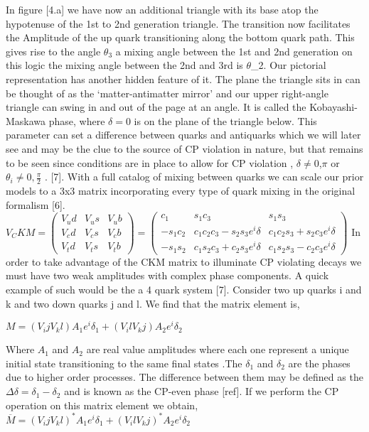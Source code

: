 In figure [4.a] we have now an additional triangle with its base atop the hypotenuse of the 1st to 2nd generation triangle. The transition now facilitates the Amplitude of the up quark transitioning along the bottom quark path. This gives rise to the angle $\theta_3$ a mixing angle between the 1st and 2nd generation on this logic the mixing angle between the 2nd and 3rd is $\theta$_2. Our pictorial representation has another hidden feature of it. The plane the triangle sits in can be thought of as the ‘matter-antimatter mirror’ and our upper right-angle triangle can swing in and out of the page at an angle. It is called the Kobayashi-Maskawa phase, where $\delta=0$ is on the plane of the triangle below. This parameter can set a difference between quarks and antiquarks which we will later see and may be the clue to the source of CP violation in nature, but that remains to be seen since  conditions are in place to allow for CP violation , $\delta\neq0$,$\pi$ or $\theta_i\neq0,\frac{\pi}{2}$ .  [7].
With a full catalog of mixing between quarks we can scale our prior models to a 3x3 matrix incorporating every type of quark mixing in the original formalism [6]. 
$V_CKM = \begin{pmatrix} V_ud & V_us & V_ub \\ V_cd & V_cs & V_cb \\ V_td & V_ts & V_tb \end{pmatrix} = \begin{pmatrix} c_1 & s_1 c_3 & s_1 s_3 \\ -s_1 c_2 & c_1 c_2 c_3 -s_2 s_3 e^i\delta & c_1 c_2 s_3 + s_2 c_3 e^i\delta \\ -s_1 s_2 & c_1 s_2 c_3 +c_2 s_3 e^i\delta & c_1 s_2 s_3 - c_2 c_3 e^i\delta \end{pmatrix}$
In order to take advantage of the CKM matrix to illuminate CP violating decays we must have two weak amplitudes with complex phase components. A quick example of such would be the a 4 quark system [7]. Consider two up quarks i and k and two down quarks j and l. We find that the matrix element is,

$M=(V_ij V_kl) A_1 e^i\delta_1 +(V_il V_kj) A_2 e^i\delta_2$ 

Where $A_1$ and $A_2$ are real value amplitudes where each one represent a unique initial state transitioning to the same final states .The $\delta_1$ and $\delta_2$ are the phases due to higher order processes. The difference between them may be defined as the $\Delta\delta = \delta_1 - \delta_2$ and is known as the CP-even phase [ref]. If we perform the CP operation on this matrix element we obtain,
$\overline{M}=(V_ij V_kl)^* A_1 e^i\delta_1 +(V_il V_kj)^* A_2 e^i\delta_2$

